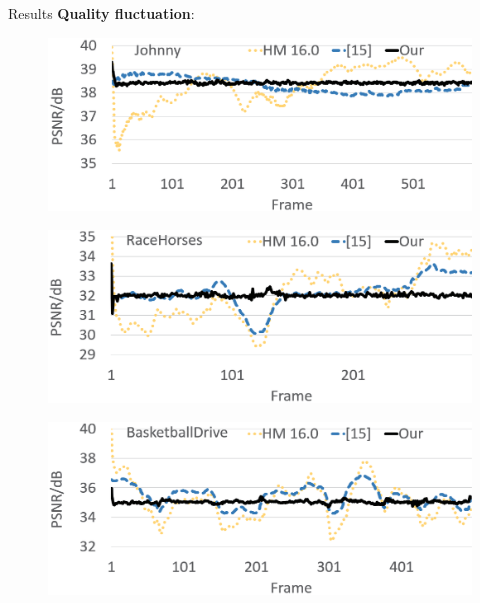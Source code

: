 \documentclass[final]{beamer}
\newlength{\onecolwid}
\begin{document}
\begin{frame}[t]
\begin{columns}[t]
\begin{column}{\onecolwid}
\begin{block}{Results}
\textbf{Quality fluctuation}:
\begin{figure}
\begin{center}
    \includegraphics[width=.90\linewidth]{Figures/rs1.eps}
\label{figurebitfluctuation}
\end{center}
\end{figure}
\begin{figure}
\begin{center}
    \includegraphics[width=.90\linewidth]{Figures/rs2.eps}
\label{figurebitfluctuation}
\end{center}
\end{figure}
\begin{figure}
\begin{center}
    \includegraphics[width=.90\linewidth]{Figures/rs3.eps}

\end{center}
\end{figure}
\end{block}
\end{column}
\end{columns}
\end{frame}
\end{document}

